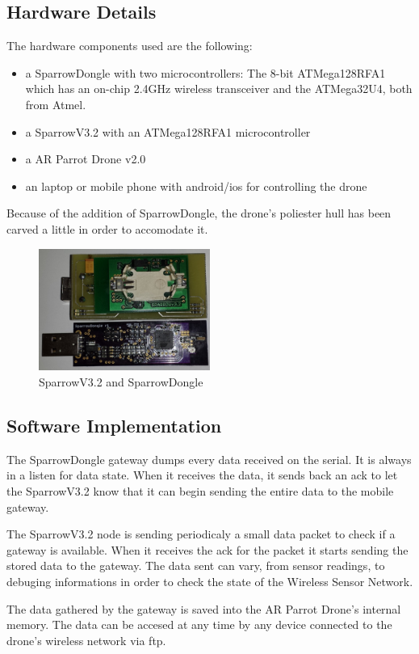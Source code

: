 \label{chap:impl}

 \subsection{Hardware Details}

The hardware components used are the following:
\begin{itemize}

\item a SparrowDongle with two microcontrollers: The 8-bit ATMega128RFA1 which has an on-chip 2.4GHz wireless transceiver and the ATMega32U4, both from Atmel.

\item a SparrowV3.2  with an ATMega128RFA1 microcontroller 

\item a AR Parrot Drone v2.0

\item an laptop or mobile phone with android/ios for controlling the drone

\end{itemize}

Because of the addition of SparrowDongle, the drone's poliester hull has been carved a little in order to accomodate it.


\begin{figure}[ht] \centering
\includegraphics[width=0.5\textwidth]{img/sparrow.jpg} \caption{SparrowV3.2 and SparrowDongle} \end{figure}



\subsection{Software Implementation}

The SparrowDongle gateway dumps every data received on the serial. It is always in a listen for data state. When it receives the data, it sends back an ack to let the SparrowV3.2 know that it can begin sending the entire data to the mobile gateway.

The SparrowV3.2 node is sending periodicaly a small data packet to check if a gateway is available. When it receives the ack for the packet it starts sending the stored data to the gateway. The data sent can vary, from sensor readings, to debuging informations in order to check the state of the Wireless Sensor Network.

The data gathered by the gateway is saved into the AR Parrot Drone's internal memory. The data can be accesed at any time by any device connected to the drone's wireless network via ftp.
